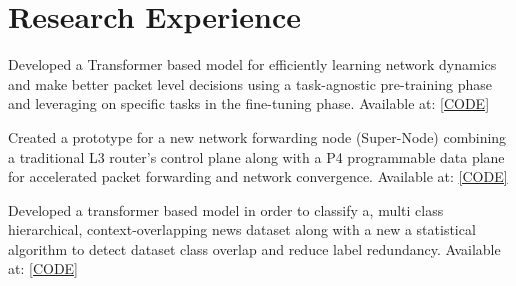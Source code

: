 \documentclass[]{onepage}
\begin{document}
\begin{minipage}[t]{0.66\textwidth} 


\section{Research Experience}

Developed a Transformer based model for efficiently learning network dynamics and make better packet level decisions using a task-agnostic pre-training phase and leveraging on specific tasks in the fine-tuning phase. Available at: {\href{https://github.com/Siddhant-Ray/Network-Traffic-Transformer}{[CODE]}}
\smallsectionsep

Created a prototype for a new network forwarding node (Super-Node) combining a traditional L3 router's control plane along with a P4 programmable data plane for accelerated packet forwarding and network convergence. Available at: {\href{https://github.com/Siddhant-Ray/FRR-P4-Super-Node-Prototype}{[CODE]}}
\smallsectionsep

Developed a transformer based model in order to classify a, multi class hierarchical, context-overlapping news dataset along with a new a statistical algorithm to detect dataset class overlap and reduce label redundancy. Available at: {\href{https://github.com/Siddhant-Ray/Attentive-neural-networks-for-news-classification}{[CODE]}}
\smallsectionsep




\end{minipage}
\end{document}

